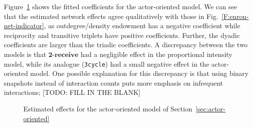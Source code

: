 \documentclass[final]{statsoc}
\begin{document}
Figure~\ref{F:enron-actor} shows the fitted coefficients for the
actor-oriented model.  We can see that the estimated network effects agree
qualitatively with those in Fig.~\ref{F:enron-net-indicator}, as
outdegree/density endowment has a negative coefficient while reciprocity and
transitive triplets have positive coefficients.  Further, the dyadic
coefficients are larger than the triadic coefficients.  A discrepancy between
the two models is that $\textbf{2-receive}$ had a negligible effect in the
proportional intensity model, while its analogue (\texttt{3cycle}) had a small
negative effect in the actor-oriented model.  One possible explanation for
this discrepancy is that using binary snapshots instead of interaction counts
puts more emphasis on infrequent interactions; [TODO: FILL IN THE BLANK]



\begin{figure}
\centering
{}
\qquad
{}
\caption{
  Estimated effects for the actor-oriented model of Section~\ref{sec:actor-oriented}
}
\label{F:enron-actor}
\end{figure}
\end{document}
